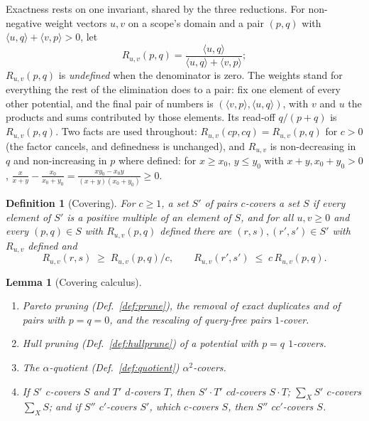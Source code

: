\documentclass{article} %
\newtheorem{definition}{Definition}
\newtheorem{lemma}{Lemma}
\begin{document}
Exactness rests on one invariant, shared by the three reductions. For non-negative
weight vectors $u,v$ on a scope's domain and a pair $(p,q)$ with
$\langle u,q\rangle+\langle v,p\rangle>0$, let
\[
  R_{u,v}(p,q)=\frac{\langle u,q\rangle}{\langle u,q\rangle+\langle v,p\rangle};
\]
$R_{u,v}(p,q)$ is \emph{undefined} when the denominator is zero. The weights stand for
everything the rest of the elimination does to a pair: fix one element of every other
potential, and the final pair of numbers is $(\langle v,p\rangle,\langle u,q\rangle)$, with
$v$ and $u$ the products and sums contributed by those elements. Its read-off $q/(p+q)$ is
$R_{u,v}(p,q)$. Two facts are used throughout: $R_{u,v}(cp,cq)=R_{u,v}(p,q)$ for $c>0$ (the
factor cancels, and definedness is unchanged), and $R_{u,v}$ is non-decreasing in $q$ and
non-increasing in $p$ where defined: for $x\ge x_0$, $y\le y_0$ with $x+y,x_0+y_0>0$,
$\frac{x}{x+y}-\frac{x_0}{x_0+y_0}=\frac{xy_0-x_0y}{(x+y)(x_0+y_0)}\ge0$.

\begin{definition}[Covering]
For $c\ge1$, a set $S'$ of pairs \emph{$c$-covers} a set $S$ if every element of $S'$ is a
positive multiple of an element of $S$, and for all $u,v\ge0$ and every $(p,q)\in S$ with
$R_{u,v}(p,q)$ defined there are $(r,s),(r',s')\in S'$ with $R_{u,v}$ defined and
\[
  R_{u,v}(r,s)\;\ge\;R_{u,v}(p,q)/c,
  \qquad
  R_{u,v}(r',s')\;\le\;c\,R_{u,v}(p,q).
\]
\end{definition}

\begin{lemma}[Covering calculus]\label{lem:cover}
\begin{enumerate}
\item \emph{Pareto pruning} (Def.~\ref{def:prune}), the removal of exact duplicates and of
  pairs with $p=q=0$, and the rescaling of query-free pairs $1$-cover.
\item \emph{Hull pruning} (Def.~\ref{def:hullprune}) of a potential with $p=q$
  $1$-covers.
\item The \emph{$\alpha$-quotient} (Def.~\ref{def:quotient}) $\alpha^2$-covers.
\item If $S'$ $c$-covers $S$ and $T'$ $d$-covers $T$, then $S'\cdot T'$
  $cd$-covers $S\cdot T$; $\sum_XS'$ $c$-covers $\sum_XS$; and if $S''$
  $c'$-covers $S'$, which $c$-covers $S$, then $S''$ $cc'$-covers $S$.
\end{enumerate}
\end{lemma}
\end{document}
